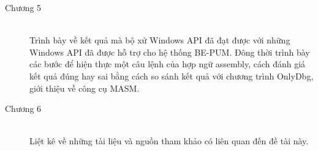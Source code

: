 \begin{description}
	\item[Chương 5] \hfill \\
	 Trình bày về kết quả mà bộ xử Windows API đã đạt được với những Windows API đã được hỗ trợ cho hệ thống BE-PUM. Đông thời trình bày các bước để hiện thực một câu lệnh của hợp ngữ assembly, cách đánh giá kết quả đúng hay sai bằng cách so sánh kết quả với chương trình OnlyDbg, giới thiệu về công cụ MASM. \\
	\item[Chương 6] \hfill \\
	 Liệt kê về những tài liệu và nguồn tham khảo có liên quan đến đề tài này.\\
\end{description}
